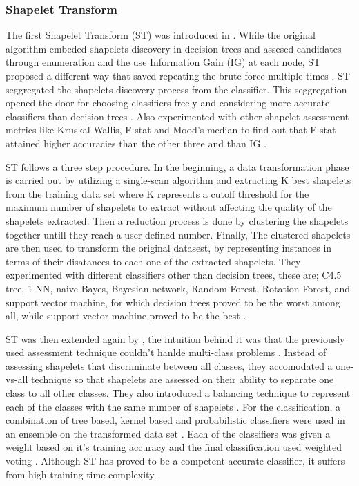 \subsubsection{Shapelet Transform}
\label{SubsubsectionST}
The first Shapelet Transform (ST) was introduced in \cite{hills2014classification}.
While the original algorithm embeded shapelets discovery in decision trees and assesed candidates through enumeration and 
the use Information Gain (IG) at each node, ST proposed a different way that saved repeating the brute force multiple times \cite{bostrom2018shapelet}.
ST seggregated the shapelets discovery process from the classifier. This seggregation opened the door for choosing classifiers freely and considering more accurate
classifiers than decision trees \cite{bagnall2017great,lines2015time}. Also \cite{hills2014classification} experimented with other shapelet assessment metrics like Kruskal-Wallis, F-stat and Mood’s median
to find out that F-stat attained higher accuracies than the other three and than IG \cite{bostrom2018shapelet}.

ST follows a three step procedure. In the beginning, a data transformation phase is carried out by utilizing a single-scan algorithm and extracting K best shapelets from the training
data set where K represents a cutoff threshold for the maximum number of shapelets to extract without affecting the quality of the shapelets extracted.
Then a reduction process is done by clustering the shapelets together untill they reach a user defined number.
Finally, The clustered shapelets are then used to transform the original datasest, by representing instances in terms of their disatances to each one of the extracted shapelets.
They experimented with different classifiers other than decision trees, these are; C4.5 tree, 1-NN, naive Bayes, Bayesian network, Random Forest, Rotation Forest, and support vector machine,
for which decision trees proved to be the worst among all, while support vector machine proved to be the best \cite{hills2014classification}.

ST was then extended again by \cite{Bostrom2017}, the intuition behind it was that the previously used assessment technique couldn't hanlde multi-class problems \cite{Bostrom2017}.
Instead of assessing shapelets that discriminate between all classes, they accomodated a one-vs-all technique so that shapelets are assessed on their ability to separate one class to all other classes.
They also introduced a balancing technique to represent each of the classes with the same number of shapelets \cite{bagnall2017great}.
For the classification, a combination of tree based, kernel based and probabilistic classifiers were used in an ensemble on the transformed data set \cite{shifaz2020ts,lines2018time}.
Each of the classifiers was given a weight based on it's training accuracy and the final classification used weighted voting \cite{Bostrom2017}.
Although ST has proved to be a competent accurate classifier, it suffers from high training-time complexity \cite{shifaz2020ts}.

